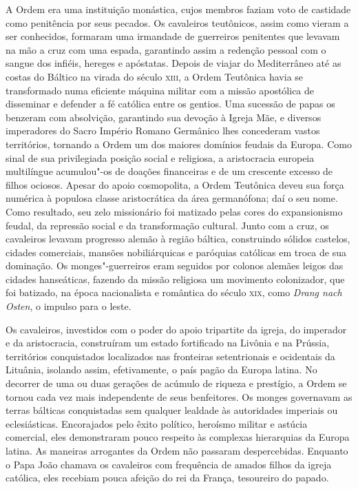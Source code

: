 A Ordem era uma instituição monástica, cujos membros faziam voto de
castidade como penitência por seus pecados. Os cavaleiros teutônicos,
assim como vieram a ser conhecidos, formaram uma irmandade de guerreiros
penitentes que levavam na mão a cruz com uma espada, garantindo assim a
redenção pessoal com o sangue dos infiéis, hereges e apóstatas. Depois
de viajar do Mediterrâneo até as costas do Báltico na virada do século
\textsc{xiii}, a Ordem Teutônica havia se transformado numa eficiente máquina
militar com a missão apostólica de disseminar e defender a fé católica
entre os gentios. Uma sucessão de papas os benzeram com absolvição,
garantindo sua devoção à Igreja Mãe, e diversos imperadores do Sacro
Império Romano Germânico lhes concederam vastos territórios, tornando a
Ordem um dos maiores domínios feudais da Europa. Como sinal de sua
privilegiada posição social e religiosa, a aristocracia europeia
multilíngue acumulou"-os de doações financeiras e de um crescente excesso
de filhos ociosos. Apesar do apoio cosmopolita, a Ordem Teutônica deveu
sua força numérica à populosa classe aristocrática da área germanófona;
daí o seu nome. Como resultado, seu zelo missionário foi matizado pelas
cores do expansionismo feudal, da repressão social e da transformação
cultural. Junto com a cruz, os cavaleiros levavam progresso alemão à
região báltica, construindo sólidos castelos, cidades comerciais,
mansões nobiliárquicas e paróquias católicas em troca de sua dominação.
Os monges"-guerreiros eram seguidos por colonos alemães leigos das
cidades hanseáticas, fazendo da missão religiosa um movimento
colonizador, que foi batizado, na época nacionalista e romântica do
século \textsc{xix}, como \textit{Drang nach Osten}, o impulso para o leste.

Os cavaleiros, investidos com o poder do apoio tripartite da igreja, do
imperador e da aristocracia, construíram um estado fortificado na
Livônia e na Prússia, territórios conquistados localizados nas
fronteiras setentrionais e ocidentais da Lituânia, isolando assim,
efetivamente, o país pagão da Europa latina. No decorrer de uma ou duas
gerações de acúmulo de riqueza e prestígio, a Ordem se tornou cada vez
mais independente de seus benfeitores. Os monges governavam as terras
bálticas conquistadas sem qualquer lealdade às autoridades imperiais ou
eclesiásticas. Encorajados pelo êxito político, heroísmo militar e
astúcia comercial, eles demonstraram pouco respeito às complexas
hierarquias da Europa latina. As maneiras arrogantes da Ordem não
passaram despercebidas. Enquanto o Papa João  chamava os cavaleiros
com frequência de amados filhos da igreja católica, eles recebiam pouca
afeição do rei da França, tesoureiro do papado.

